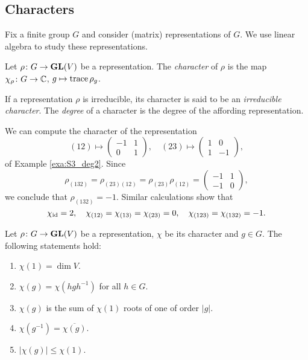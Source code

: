 \subsection{Characters}

Fix a finite group $G$ and consider
(matrix) representations of $G$. We use linear algebra to study 
these representations. 

\begin{definition}
	Let $\rho\colon G\to\mathbf{GL}(V)$ be a representation. The \emph{character} of $\rho$ 
	is the map $\chi_\rho\colon G\to\mathbb{C}$, $g\mapsto\operatorname{trace}\rho_g$. 	
\end{definition}

If a representation $\rho$ is irreducible, its character is said to be an 
\emph{irreducible character}. The \emph{degree} of a character is the degree of the affording
representation. 

\begin{example}
    We can compute the character of the representation
    \[
    (12)\mapsto\begin{pmatrix}
    -1 & 1\\
    0 & 1
  \end{pmatrix},
  \quad
  (23)\mapsto\begin{pmatrix}
    1 & 0\\
    1 & -1
  \end{pmatrix},
  \]
    of Example \ref{exa:S3_deg2}. Since
    \[
\rho_{(132)}=\rho_{(23)(12)}=\rho_{(23)}\rho_{(12)}
=\begin{pmatrix}
    -1&1\\
-1&0
    \end{pmatrix},
\]
we conclude that $\rho_{(132)}=-1$. Similar calculations show
that
    \[
    \chi_{\operatorname{id}}=2, 
    \quad\chi_{(12)}=\chi_{(13)}=\chi_{(23)}=0,
    \quad 
    \chi_{(123)}=\chi_{(132)}=-1.
    \]
\end{example}

\begin{proposition}
	Let $\rho\colon G\to\mathbf{GL}(V)$ be a representation, $\chi$ be its character and $g\in G$.
	The following statements hold:
	\begin{enumerate}
		\item $\chi(1)=\dim V$. 
		\item $\chi(g)=\chi(hgh^{-1})$ for all $h\in G$.
		\item $\chi(g)$ is the sum of $\chi(1)$ roots of one of order $|g|$. 
		\item $\chi(g^{-1})=\overline{\chi(g)}$. 
		\item $|\chi(g)|\leq\chi(1)$.  
	\end{enumerate} 
\end{proposition}

